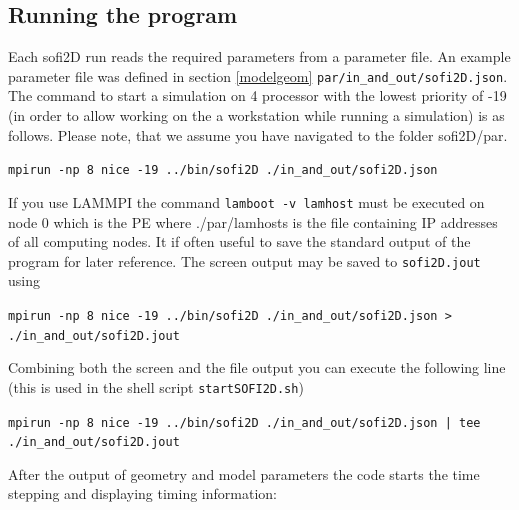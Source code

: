 \documentclass[11pt,onecolumn,oneside]{article}
\begin{document}
\subsection{Running the program}\label{compexec1} 
Each sofi2D run reads the required parameters from a parameter file. An example parameter file was defined in section \ref{modelgeom} \texttt{par/in\_and\_out/sofi2D.json}. The command to start a simulation on 4 processor with the lowest priority of -19 (in order to allow working on the a workstation while running a simulation) is as follows. Please note, that we assume you have navigated to the folder sofi2D/par.

\texttt{mpirun -np 8 nice -19 ../bin/sofi2D ./in\_and\_out/sofi2D.json }

If you use LAMMPI the command \texttt{lamboot -v lamhost} must be executed on node 0 which is the PE where ./par/lamhosts is the file containing IP addresses of all computing nodes. It if often useful to save the standard output of the program for later reference. The screen output may be saved to \texttt{sofi2D.jout} using 

\texttt{mpirun -np 8 nice -19 ../bin/sofi2D ./in\_and\_out/sofi2D.json > ./in\_and\_out/sofi2D.jout}

Combining both the screen and the file output you can execute the following line (this is used in the shell script \texttt{startSOFI2D.sh})

\texttt{mpirun -np 8 nice -19 ../bin/sofi2D ./in\_and\_out/sofi2D.json | tee ./in\_and\_out/sofi2D.jout}

After the output of geometry and model parameters the code starts the time stepping and displaying timing information:
\end{document}
